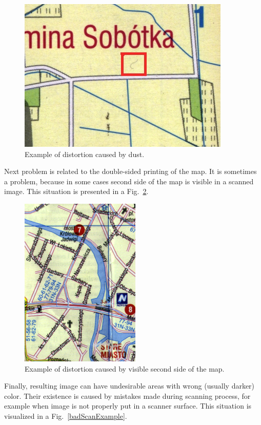 \documentclass[a4paper,onecolumn,oneside,12pt]{memoir}
\begin{document}
\begin{figure}[!ht]
\begin{center}
\includegraphics[scale=3.0]{images/dustExample.jpg}
\caption{Example of distortion caused by dust.}
\label{dustExample}
\end{center}
\end{figure}

Next problem is related to the double-sided printing of the map. It is sometimes a problem, because
in some cases second side of the map is visible in a scanned image. This situation is presented in a
Fig.~\ref{doubleSidedMap}.

\begin{figure}[!ht]
\begin{center}
\includegraphics[scale=0.8]{images/doubleSidedMap.png}
\caption{Example of distortion caused by visible second side of the map.}
\label{doubleSidedMap}
\end{center}
\end{figure}

Finally, resulting image can have undesirable areas with wrong (usually darker) color. Their
existence is caused by mistakes made during scanning process, for example when image is not properly
put in a scanner surface. This situation is visualized in a Fig.~\ref{badScanExample}.
\end{document}
